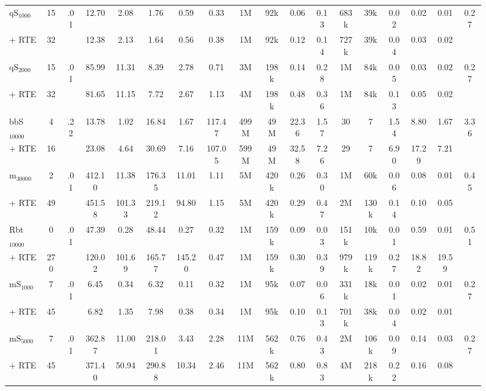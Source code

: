 \documentclass[french]{spimufcphdthesis}
\begin{document}
\begin{landscape}
\begin{figure}[h]
\begin{tabular}{|l|c|c|c|c|c|c|c|c|c|c|c|c|c|c|c|c|c|}
    \hline
    qS$_{1000}$ &15 &\multirow{2}{*}{.01} &12.70 &2.08 &1.76 &0.59 &0.33 &1M &92k &0.06 &0.13 &683k &39k &0.02 &0.02 &0.01 &\multirow{2}{*}{0.27}\\
+ RTE &32 &&12.38 &2.13 &1.64 &0.56 &0.38 &1M &92k &0.12 &0.14 &727k &39k &0.04 &0.03 &0.02 &\\

    \hline
    qS$_{2000}$ &15 &\multirow{2}{*}{.01} &85.99 &11.31 &8.39 &2.78 &0.71 &3M &198k &0.14 &0.28 &1M &84k &0.05 &0.03 &0.02 &\multirow{2}{*}{0.27}\\
+ RTE &32 &&81.65 &11.15 &7.72 &2.67 &1.13 &4M &198k &0.48 &0.36 &1M &84k &0.13 &0.05 &0.02 &\\
    \hline
    bbS$_{10000}$ &4 &\multirow{2}{*}{.22} &13.78 &1.02 &16.84 &1.67 &117.47 &499M &49M &22.36 &1.57 &30 &7 &1.54 &8.80 &1.67 &\multirow{2}{*}{3.36}\\
+ RTE &16 &&23.08 &4.64 &30.69 &7.16 &107.05 &599M &49M &32.58 &7.26 &29 &7 &6.90 &17.29 &7.21 &\\
    \hline
    m$_{30000}$ &2 &\multirow{2}{*}{.01} &412.10 &11.38 &176.35 &11.01 &1.11 &5M &420k &0.26 &0.30 &1M &60k &0.06 &0.08 &0.01 &\multirow{2}{*}{0.45}\\
+ RTE &49 &&451.58 &101.33 &219.12 &94.80 &1.15 &5M &420k &0.29 &0.47 &2M &130k &0.14 &0.10 &0.05 &\\

    \hline
    Rbt$_{10000}$ &0 &\multirow{2}{*}{.01} &47.39 &0.28 &48.44 &0.27 &0.32 &1M &159k &0.09 &0.03 &151k &10k &0.01 &0.59 &0.01 &\multirow{2}{*}{0.51}\\
+ RTE &270 &&120.02 &101.69 &165.77 &145.20 &0.47 &1M &159k &0.30 &0.39 &979k &119k &0.27 &18.82 &19.59 &\\
    \hline
mS$_{1000}$ &7 &\multirow{2}{*}{.01} &6.45 &0.34 &6.32 &0.11 &0.32 &1M &95k &0.07 &0.06 &331k &18k &0.01 &0.02 &0.01 &\multirow{2}{*}{0.27}\\
+ RTE &45 &&6.82 &1.35 &7.98 &0.38 &0.34 &1M &95k &0.10 &0.13 &701k &38k &0.04 &0.02 &0.01 &\\
        \hline
mS$_{5000}$ &7 &\multirow{2}{*}{.01} &362.87 &11.00 &218.01 &3.43 &2.28 &11M &562k &0.76 &0.43 &2M &106k &0.09 &0.14 &0.03 &\multirow{2}{*}{0.27}\\
+ RTE &45 &&371.40 &50.94 &290.88 &10.34 &2.46 &11M &562k &0.80 &0.83 &4M &218k &0.22 &0.16 &0.08 &\\


\end{tabular}
\end{figure}
\end{landscape}
\end{document}
